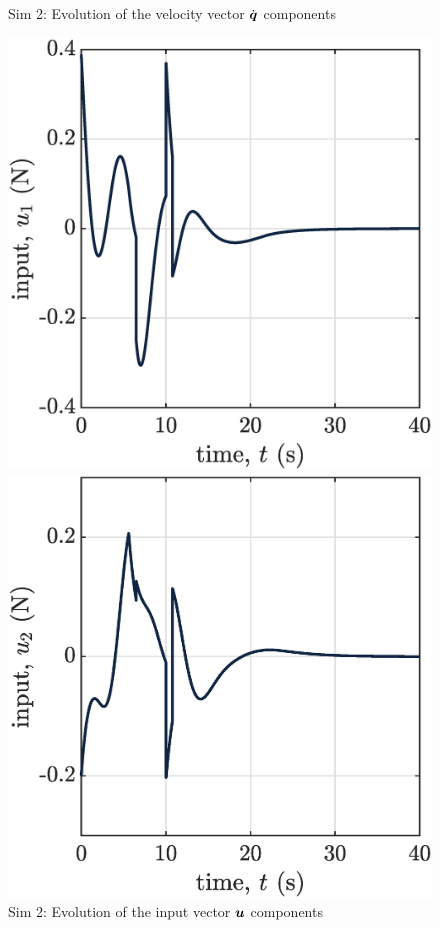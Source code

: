 \begin{figure}[!ht]
\begin{minipage}[t]{.45\textwidth}
    \end{minipage}  
    \caption{\label{fig:sim2vel}Sim 2: Evolution of the velocity vector $\dot{\boldsymbol{q}}$ components}
    \begin{minipage}[t]{.45\textwidth}
        \centering
        \includegraphics[width=\textwidth]{figures/sim2u1.eps}
    \end{minipage}
    \hfill
    \begin{minipage}[t]{.45\textwidth}
        \centering
        \includegraphics[width=\textwidth]{figures/sim2u2.eps}
    \end{minipage} 
    \caption{\label{fig:sim2in}Sim 2: Evolution of the input vector $\boldsymbol{u}$ components}
\end{figure}
